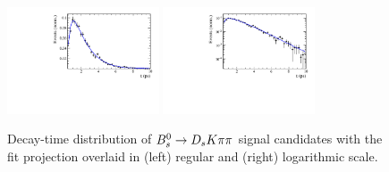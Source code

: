 \begin{figure}[h]
        \centering
                \includegraphics[width=0.4\textwidth, height = !]{figs/timeFit/signal/h_t.pdf}
                \includegraphics[width=0.4\textwidth, height = !]{figs/timeFit/signal/h_t_log.pdf}
                \caption{Decay-time distribution of ${{B}^0_{s}}\rightarrow{\ensuremath{{D}_{s}}}{\ensuremath{K}}{\ensuremath{\pi}}{\ensuremath{\pi}}$ signal candidates with the fit projection overlaid in (left) regular and (right) logarithmic scale.}
                \label{fig:tFitSig}
\end{figure}
